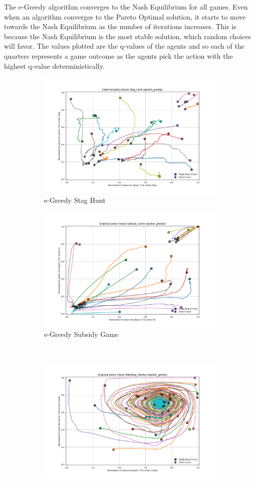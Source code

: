 \documentclass[12pt,letterpaper, onecolumn]{exam}
\begin{document}
The e-Greedy algorithm converges to the Nash Equilibrium for all games. Even when an algorithm converges to the Pareto Optimal solution, it starts to move towards the Nash Equilibrium
as the number of iterations increases. This is because the Nash Equilibrium is the most stable solution, which random choices will favor. The values plotted are the q-values of the agents
and so each of the quarters represents a game outcome as the agents pick the action with the highest q-value deterministically.

\begin{figure}
    \begin{subfigure}{.5\textwidth}
      \centering
      \includegraphics[width=.6\linewidth]{plots/replicator_trajectoreis_Stag_Hunt_epsilon_greedy.png}
      \caption{e-Greedy Stag Hunt}
      \label{fig:sfigesh}
    \end{subfigure}%
    \begin{subfigure}{.5\textwidth}
      \centering
      \includegraphics[width=.6\linewidth]{plots/replicator_trajectoreis_Subsidy_Game_epsilon_greedy.png}
      \caption{e-Greedy Subsidy Game}
      \label{fig:sfigesg}
    \end{subfigure}\\
    \begin{subfigure}{.5\textwidth}
      \centering
      \includegraphics[width=.6\linewidth]{plots/replicator_trajectoreis_Matching_Pennies_epsilon_greedy.png}

\end{subfigure}
\end{figure}
\end{document}
